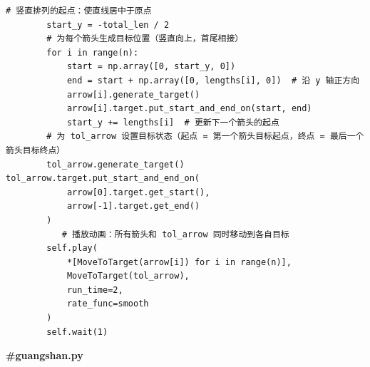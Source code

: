\documentclass[12pt,a4paper]{ctexrep}
\begin{document}
\begin{lstlisting}[style=pycode]
        # 竖直排列的起点：使直线居中于原点
        start_y = -total_len / 2
        # 为每个箭头生成目标位置（竖直向上，首尾相接）
        for i in range(n):
            start = np.array([0, start_y, 0])
            end = start + np.array([0, lengths[i], 0])  # 沿 y 轴正方向
            arrow[i].generate_target()
            arrow[i].target.put_start_and_end_on(start, end)
            start_y += lengths[i]  # 更新下一个箭头的起点
        # 为 tol_arrow 设置目标状态（起点 = 第一个箭头目标起点，终点 = 最后一个箭头目标终点）
        tol_arrow.generate_target()
tol_arrow.target.put_start_and_end_on(
            arrow[0].target.get_start(),
            arrow[-1].target.get_end()
        )
           # 播放动画：所有箭头和 tol_arrow 同时移动到各自目标
        self.play(
            *[MoveToTarget(arrow[i]) for i in range(n)],
            MoveToTarget(tol_arrow),
            run_time=2,
            rate_func=smooth
        )
        self.wait(1)
\end{lstlisting}

\textbf{\#guangshan.py}
\end{document}
